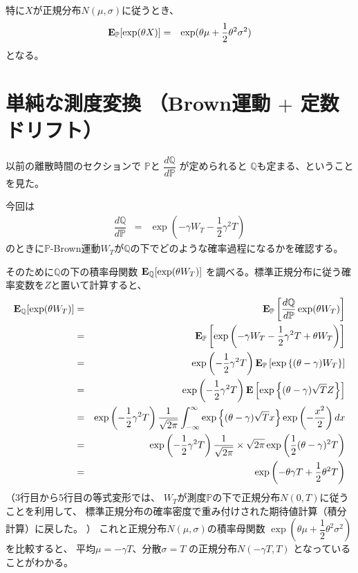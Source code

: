 \documentclass[uplatex,a4j,12pt,dvipdfmx]{jsarticle}
\begin{document}
特に$X$が正規分布$N(\mu ,\sigma)$に従うとき、
%
\begin{eqnarray*}
	{\bf E}_{\mathbb{P}}[ \exp( \theta X ) ]
	&=&
	\exp( \theta \mu + \dfrac{1}{2} \theta^{2} \sigma^{2} )
\end{eqnarray*}
%
となる。

\section{単純な測度変換 （Brown運動 $+$ 定数ドリフト）}

以前の離散時間のセクションで
$\mathbb{P}$と
$\dfrac{ d \mathbb{Q} }{ d \mathbb{P} }$
が定められると
$\mathbb{Q}$も定まる、ということを見た。

今回は
%
\begin{eqnarray*}
	\dfrac{ d \mathbb{Q} }{ d \mathbb{P} }
	&=&
	\exp \left( - \gamma W_{T} - \dfrac{1}{2} \gamma^{2} T \right)
\end{eqnarray*}
%
のときに$\mathbb{P}$-Brown運動$W_{T}$が$\mathbb{Q}$の下でどのような確率過程になるかを確認する。

そのために$\mathbb{Q}$の下の積率母関数
${\bf E}_{\mathbb{Q}}[ \exp( \theta W_{T} ) ]$
を調べる。標準正規分布に従う確率変数を$Z$と置いて計算すると、
%
\begin{eqnarray*}
	{\bf E}_{\mathbb{Q}}[ \exp( \theta W_{T} ) ]
	&=&
	{\bf E}_{\mathbb{P}} \left[ \dfrac{ d \mathbb{Q} }{ d \mathbb{P} } \exp( \theta W_{T} ) \right]
	\\ &=&
	{\bf E}_{\mathbb{P}} \left[ \exp \left( - \gamma W_{T} - \dfrac{1}{2} \gamma^{2} T + \theta W_{T} \right) \right]
	\\ &=&
	\exp \left( - \dfrac{1}{2} \gamma^{2} T \right)
	{\bf E}_{\mathbb{P}} \left[ \exp \left\{ ( \theta - \gamma ) W_{T} \right\} \right]
	\\ &=&
	\exp \left( - \dfrac{1}{2} \gamma^{2} T \right)
	{\bf E} \left[ \exp \left\{ ( \theta - \gamma ) \sqrt{T} Z \right\} \right]
	\\ &=&
	\exp \left( - \dfrac{1}{2} \gamma^{2} T \right)
	\dfrac{1}{\sqrt{2 \pi}}
	\int^{\infty}_{-\infty}
	\exp \left\{ ( \theta - \gamma ) \sqrt{T} x \right\} \exp \left( -\dfrac{x^{2}}{2} \right) dx
	\\ &=&
	\exp \left( - \dfrac{1}{2} \gamma^{2} T \right)
	\dfrac{1}{\sqrt{2 \pi}}
	\times \sqrt{ 2 \pi }
	\exp \left( \dfrac{1}{2} (\theta - \gamma)^{2} T \right)
	\\ &=&
	\exp \left( - \theta \gamma T + \dfrac{1}{2} \theta^{2} T \right)
\end{eqnarray*}
%
（3行目から5行目の等式変形では、
$W_{T}$が測度$\mathbb{P}$の下で正規分布$N(0,T)$に従うことを利用して、
標準正規分布の確率密度で重み付けされた期待値計算（積分計算）に戻した。
）
これと正規分布$N(\mu,\sigma)$の積率母関数
$\exp( \theta \mu + \dfrac{1}{2} \theta^{2} \sigma^{2} )$
を比較すると、
平均$\mu = - \gamma T$、分散$\sigma = T$
の正規分布$N(- \gamma T,T)$
となっていることがわかる。
\end{document}
